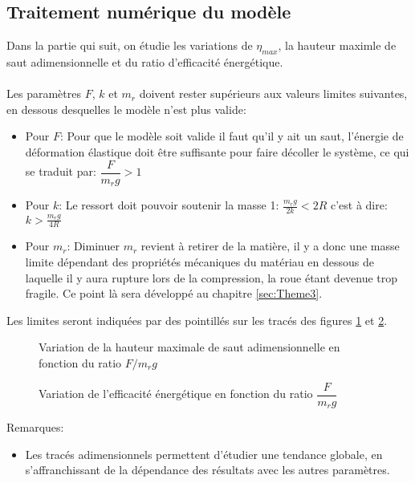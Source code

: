 \subsection{Traitement numérique du modèle}
Dans la partie qui suit, on étudie les variations de $\eta_{max}$, la hauteur maximle de saut adimensionnelle et du ratio d'efficacité énergétique.
\\ 
\\ 
Les paramètres $F$, $k$ et $m_r$ doivent rester supérieurs aux valeurs limites suivantes, en dessous desquelles le modèle n'est plus valide:
\begin{itemize}
    \item Pour $F$: Pour que le modèle soit valide il faut qu’il y ait un saut, l'énergie de déformation élastique doit être suffisante pour faire décoller le système, ce qui se traduit par: $\dfrac{F}{m_r g}>1$
    \item Pour $k$: Le ressort doit pouvoir soutenir la masse 1: $\frac{m_r g}{2k}<2R$ c'est à dire: $k>\frac{m_r g}{4R}$ 
    \item Pour $m_r$: Diminuer $m_r$ revient à retirer de la matière, il y a donc une masse limite dépendant des propriétés mécaniques du matériau en dessous de laquelle il y aura rupture lors de la compression, la roue étant devenue trop fragile. Ce point là sera développé au chapitre \ref{sec:Theme3}.
\end{itemize}
Les limites seront indiquées par des pointillés sur les tracés des figures \ref{fig:eta} et \ref{fig:effe}.
\\

\begin{figure}
\centering
\def\svgwidth{320}

\caption{Variation de la hauteur maximale de saut adimensionnelle en fonction du ratio $F/m_r g$}
\label{fig:eta}
\end{figure}


\begin{figure}
\centering
\def\svgwidth{320}

\caption{Variation de l'efficacité énergétique en fonction du ratio $\dfrac{F}{m_r g}$}
\label{fig:effe}
\end{figure}


Remarques:
\begin{itemize}
    \item Les tracés adimensionnels permettent d'étudier une tendance globale, en s'affranchissant de la dépendance des résultats avec les autres paramètres.
    
\end{itemize}

